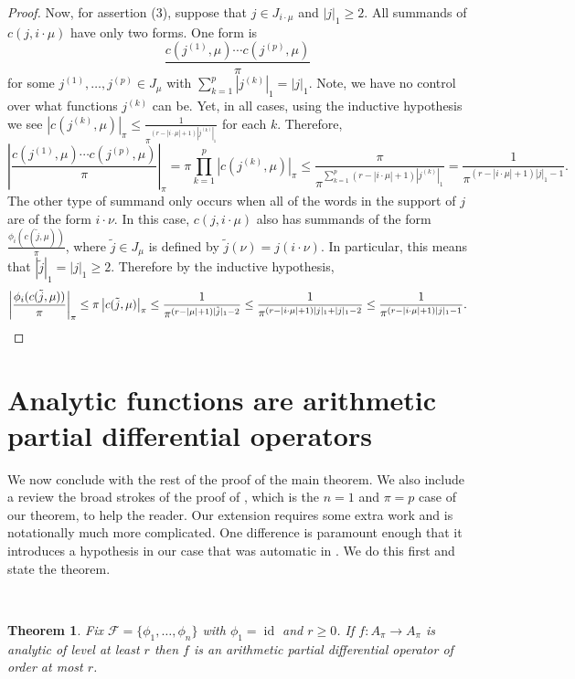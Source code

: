 \documentclass[10pt]{amsart}
\theoremstyle{Theorem}
\newtheorem{thm}{Theorem}[section]
\theoremstyle{definition}
\newcommand{\id}{\operatorname{id}}
\newcommand{\cF}{\mathcal{F}}
\begin{document}
\begin{proof}
Now, for assertion (3), suppose that $j\in J_{i \cdot \mu}$ and $|j|_1\geq 2$. All summands of $c(j,i \cdot \mu)$ have only two forms. One form is \begin{equation*}
\frac{c(j^{(1)},\mu) \cdots c(j^{(p)},\mu)}{\pi}\end{equation*}
for some $j^{(1)},\ldots,j^{(p)} \in J_\mu$ with $\sum_{k=1}^p |j^{(k)}|_1 = |j|_1$. Note,
 we have no control over what functions $j^{(k)}$ can be. Yet, in all cases, using the inductive hypothesis we see $|c(j^{(k)},\mu)|_\pi \leq \frac{1}{\pi^{(r-|i\cdot \mu| + 1)|j^{(k)}|_1}}$ for each $k$. Therefore,  
\[\left|\frac{c(j^{(1)},\mu) \cdots c(j^{(p)},\mu)}{\pi}\right|_\pi =\pi\prod_{k=1}^p|c(j^{(k)},\mu)|_\pi\leq \frac{\pi}{\pi^{\sum_{k=1}^p(r-|i\cdot \mu|+1)|j^{(k)}|_1}} = \frac{1}{\pi^{(r-|i\cdot \mu|+1)|j|_1-1}}.\] The other type of summand only occurs when all of the words in the support of $j$ are of the form $i\cdot \nu$. In this case, $c(j,i\cdot \mu)$ also has summands of the form $\frac{\phi_i(c(\tilde j,\mu))}{\pi}$, where $\tilde j\in J_\mu$ is defined by $\tilde j(\nu) = j(i\cdot \nu)$.  In particular, this means that $|\tilde j|_1 = |j|_1\geq 2$.  Therefore by the inductive hypothesis,
\[\left|\frac{\phi_i(c(\tilde j,\mu))}{\pi}\right|_\pi \leq \pi\left|c(\tilde j,\mu)\right|_\pi \leq \frac{1}{\pi^{(r-|\mu|+1)|\tilde j|_1 - 2}}\leq  \frac{1}{\pi^{(r-|i\cdot \mu| + 1)|j|_1 + |j|_1 -2}}\leq \frac{1}{\pi^{(r-|i\cdot \mu| + 1)|j|_1 - 1}}.\qedhere\]
\end{proof}
    


\section{Analytic functions are arithmetic partial differential operators}\label{sec:analtoapdo}

We now conclude with the rest of the proof of the main theorem. We also include a review the broad strokes of the proof of \cite[Thm. 5]{BRS11}, which is the $n = 1$ and $\pi = p$ case of our theorem, to help the reader. Our extension requires some extra work and is notationally much more complicated. One difference is paramount enough that it introduces a hypothesis in our case that was automatic in \cite{BRS11}. We do this first and state the theorem. 

\

 


\begin{thm}\label{thm:analtopado} Fix $\cF = \{ \phi_1,\ldots,\phi_n\}$ with $\phi_1 = \id$ and $r \geq 0$. If $f \colon A_\pi \to A_\pi$ is analytic of level at least $r$ then $f$ is an arithmetic partial differential operator of order at most $r$. 
\end{thm}
\end{document}
